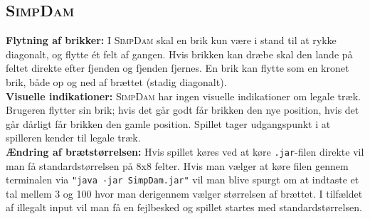 \subsection{\textsc{SimpDam}}\label{sec:designSimpDam}


\textbf{Flytning af brikker:} 
I \textsc{SimpDam} skal en brik kun være i stand til at rykke diagonalt, og flytte ét felt af gangen. Hvis brikken kan dræbe skal den lande på feltet direkte efter fjenden og fjenden fjernes. En brik kan flytte som en kronet brik, både op og ned af brættet (stadig diagonalt). 
\\

\textbf{Visuelle indikationer:} 
\textsc{SimpDam} har ingen visuelle indikationer om legale træk. Brugeren flytter sin brik; hvis det går godt får brikken den nye position, hvis det går dårligt får brikken den gamle position. Spillet tager udgangspunkt i at spilleren kender til legale træk.
\\

\textbf{Ændring af brætstørrelsen:} 
Hvis spillet køres ved at køre \texttt{.jar}-filen direkte vil man få standardstørrelsen på 8x8 felter. Hvis man vælger at køre filen gennem terminalen via \texttt{"java -jar SimpDam.jar"} vil man blive spurgt om at indtaste et tal mellem 3 og 100 hvor man derigennem vælger størrelsen af brættet. I tilfældet af illegalt input vil man få en fejlbesked og spillet startes med standardstørrelsen. 